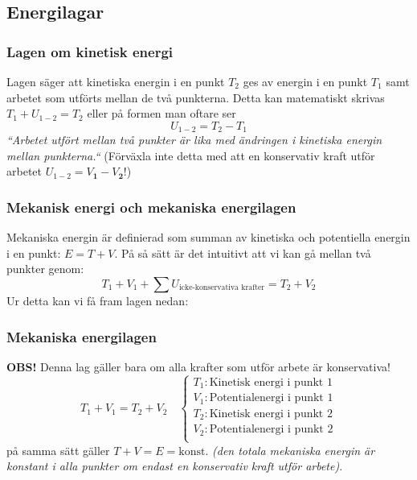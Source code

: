 \documentclass{article}
\newenvironment{ankiflashcard}[1]{}{}
\begin{document}
\begin{paracol}{2}
\subsection{Energilagar}

\begin{ankiflashcard}{Formulera lagen om kinetisk energi}
\subsubsection{Lagen om kinetisk energi}
Lagen säger att kinetiska energin i en punkt $T_2$ ges av energin i en punkt $T_1$ samt arbetet som utförts mellan de två punkterna. Detta kan matematiskt skrivas $T_1 + U_{1-2} = T_2$ eller på formen man oftare ser
$$
U_{1-2} = T_2 - T_1
$$
\textit{``Arbetet utfört mellan två punkter är lika med ändringen i kinetiska energin mellan punkterna.``}
(Förväxla inte detta med att en konservativ kraft utför arbetet $U_{1-2}=V_{\mathbf 1}-V_{\mathbf 2}$!)
\end{ankiflashcard}

\begin{ankiflashcard}{Formulera mekanisk energi och skillnaden i mekanisk energi.}
\subsubsection{Mekanisk energi och mekaniska energilagen}
Mekaniska energin är definierad som summan av kinetiska och potentiella energin i en punkt: $E = T + V$. På så sätt är det intuitivt att vi kan gå mellan två punkter genom:
$$
T_1 + V_1 + \sum U_{\text{icke-konservativa krafter}} = T_2 + V_2
$$
\end{ankiflashcard}
Ur detta kan vi få fram lagen nedan:
\begin{ankiflashcard}{Formulera mekaniska energilagen}
    
\subsubsection{Mekaniska energilagen}
\textbf{OBS!} Denna lag gäller bara om alla krafter som utför arbete är konservativa!
$$
T_1 + V_1 = T_2 + V_2\quad\left\{\begin{array}{l}T_1: \text{Kinetisk energi i punkt 1} \\V_1: \text{Potentialenergi i punkt 1} \\T_2: \text{Kinetisk energi i punkt 2} \\V_2: \text{Potentialenergi i punkt 2} \\\end{array}\right.$$
på samma sätt gäller
$
T + V = E = \text{konst.}
$
\textit{(den totala mekaniska energin är konstant i alla punkter om endast en konservativ kraft utför arbete)}.
\end{ankiflashcard}


\end{paracol}
\end{document}
